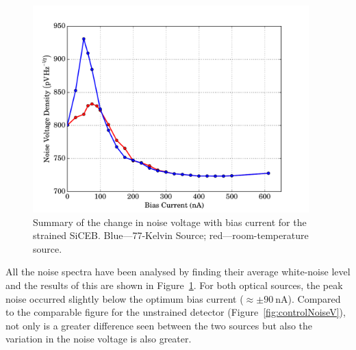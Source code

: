\par 
\begin{figure}[tb]
\begin{center}
\includegraphics[width = 0.95\textwidth]{figures/strained_noiseVoltage}
\caption[Summary of the change in noise voltage with bias current for the strained SiCEB]{Summary of the change in noise voltage with bias current for the strained SiCEB. Blue---77-Kelvin Source; red---room-temperature source.}
\label{fig:strainedlNoiseV}
\end{center}
\end{figure}
All the noise spectra have been analysed by finding their average white-noise level and the results of this are shown in Figure~\ref{fig:strainedlNoiseV}. For both optical sources, the peak noise occurred slightly below the optimum bias current ($\approx\pm 90~\mathrm{nA}$). Compared to the comparable figure for the unstrained detector (Figure~\ref{fig:controlNoiseV}), not only is a greater difference seen between the two sources but also the variation in the noise voltage is also greater. 
